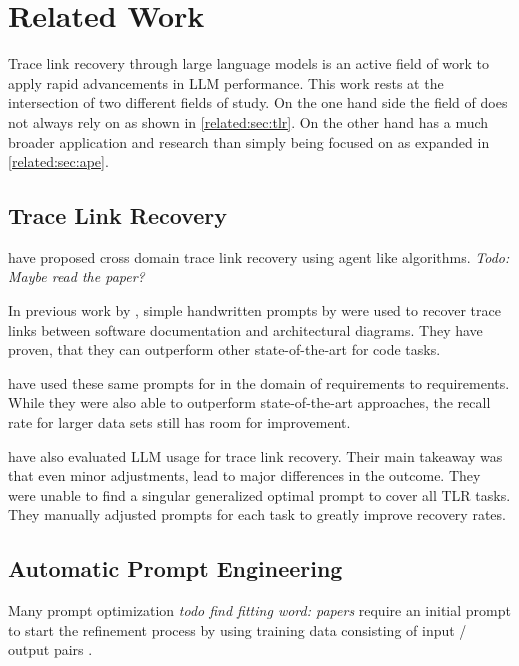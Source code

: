\chapter{Related Work}
Trace link recovery through large language models is an active field of work to apply rapid advancements in LLM performance.
This work rests at the intersection of two different fields of study. On the one hand side the field of \TLR does not always rely on \LLMs as shown in \autoref{related:sec:tlr}. On the other hand \APE has a much broader application and research than simply being focused on \TLR as expanded in \autoref{related:sec:ape}.


\section{Trace Link Recovery}
\label{related:sec:tlr}
 have proposed cross domain trace link recovery using agent like algorithms. \textit{Todo: Maybe read the paper?}

In previous work by , simple handwritten prompts by  were used to recover trace links between software documentation and architectural diagrams. They have proven, that they can outperform other state-of-the-art for code tasks. 

 have used these same prompts for \TLR in the domain of requirements to requirements. While they were also able to outperform state-of-the-art approaches, the recall rate for larger data sets still has room for improvement.

 have also evaluated LLM usage for trace link recovery. Their main takeaway was that even minor adjustments,  lead to major differences in the outcome. They were unable to find a singular generalized optimal prompt to cover all TLR tasks. They manually adjusted prompts for each task to greatly improve recovery rates.


\section{Automatic Prompt Engineering}
\label{related:sec:ape}
Many prompt optimization \textit{todo find fitting word: papers} require an initial prompt to start the refinement process by using training data consisting of input / output pairs \cite{ramnath2025SystematicSurvey}.


